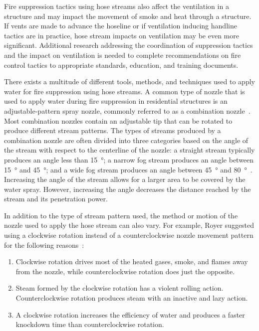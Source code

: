 \documentclass[12pt,oneside]{book}
\begin{document}
Fire suppression tactics using hose streams also affect the ventilation in a structure and may impact the movement of smoke and heat through a structure. If vents are made to advance the hoseline or if ventilation inducing handline tactics are in practice, hose stream impacts on ventilation may be even more significant. Additional research addressing the coordination of suppression tactics and the impact on ventilation is needed to complete recommendations on fire control tactics to appropriate standards, education, and training documents.

There exists a multitude of different tools, methods, and techniques used to apply water for fire suppression using hose streams. A common type of nozzle that is used to apply water during fire suppression in residential structures is an adjustable-pattern spray nozzle, commonly referred to as a combination nozzle~\cite{NFPA_1964}. Most combination nozzles contain an adjustable tip that can be rotated to produce different stream patterns. The types of streams produced by a combination nozzle are often divided into three categories based on the angle of the stream with respect to the centerline of the nozzle: a straight stream typically produces an angle less than 15\SI{}{\degree}; a narrow fog stream produces an angle between 15\SI{}{\degree} and 45\SI{}{\degree}; and a wide fog stream produces an angle between 45\SI{}{\degree} and 80\SI{}{\degree}~\cite{IFSTA:Essentials_of_FF}. Increasing the angle of the stream allows for a larger area to be covered by the water spray. However, increasing the angle decreases the distance reached by the stream and its penetration power. 

In addition to the type of stream pattern used, the method or motion of the nozzle used to apply the hose stream can also vary. For example, Royer suggested using a clockwise rotation instead of a counterclockwise nozzle movement pattern for the following reasons~\cite{Royer:ISU}:
\begin{enumerate} 
	\item Clockwise rotation drives most of the heated gases, smoke, and flames away from the nozzle, while counterclockwise rotation does just the opposite.
	\item Steam formed by the clockwise rotation has a violent rolling action. Counterclockwise rotation produces steam with an inactive and lazy action.
	\item A clockwise rotation increases the efficiency of water and produces a faster knockdown time than counterclockwise rotation.
\end{enumerate}
\end{document}
